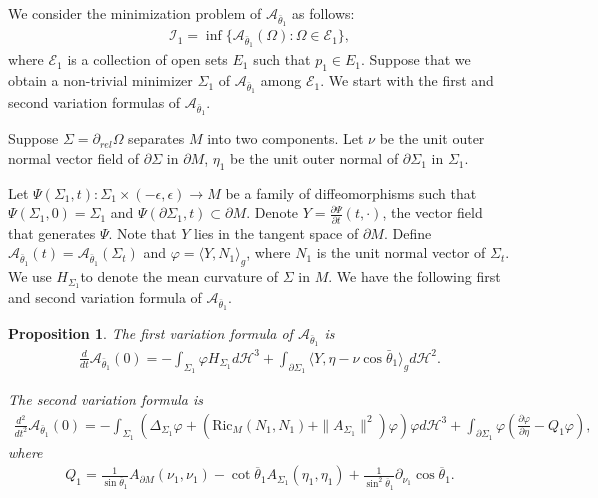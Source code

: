 \documentclass[11pt,letterpaper]{amsart}
\newtheorem{prop}{Proposition}[section]
\begin{document}
We consider the minimization problem of $\mathcal A_{\bar{\theta}_1}$ as follows:
\begin{align}
    \mathcal I_1=\inf\{\mathcal A_{\bar{\theta}_1}(\Omega):\Omega\in\mathcal E_1\},
\end{align}
where $\mathcal E_1$ is a collection of open sets $E_1$ such that $p_1\in E_1$.
Suppose that we obtain a non-trivial minimizer $\Sigma_1$ of $\mathcal A_{\bar{\theta}_1}$ among $\mathcal E_1$. We start with the first and second variation formulas of $\mathcal A_{\bar{\theta}_1}$. 

Suppose $\Sigma=\partial_{rel}\Omega$ separates $M$ into two components. Let $\nu$ be the unit outer normal vector field of $\partial \Sigma$ in $\partial M$, $\eta_1$ be the unit outer normal of $\partial\Sigma_1$ in $\Sigma_1$. 

Let $\Psi(\Sigma_1,t):\Sigma_1\times (-\epsilon,\epsilon)\to M$ be a family of diffeomorphisms such that $\Psi(\Sigma_1,0)=\Sigma_1$ and $\Psi(\partial\Sigma_1,t)\subset \partial M$. Denote $Y=\frac{\partial \Psi}{\partial t}(t,\cdot)$, the vector field that generates $\Psi$. Note that $Y$ lies in the tangent space of $\partial M$. Define $\mathcal A_{\bar{\theta}_1}(t)=\mathcal A_{\bar{\theta}_1}(\Sigma_t)$ and $\varphi=\langle Y,N_1\rangle_g$, where $N_1$ is the unit normal vector of $\Sigma_t$. We use $H_{\Sigma_1}$to denote the mean curvature of $\Sigma$ in $M$. We have the following first and second variation formula of $\mathcal{A}_{\bar{\theta}_1}$.

\begin{prop}\label{prop: first slicing variation}
The first variation formula of $\mathcal A_{\bar{\theta}_1}$ is
\begin{align}
\frac{d}{dt}\mathcal A_{\bar{\theta}_1}(0)=-\int_{\Sigma_1}\varphi H_{\Sigma_1} d\mathcal H^3+\int_{\partial\Sigma_1}\langle Y,\eta-\nu\cos\bar{\theta}_1\rangle_gd \mathcal H^2.
\end{align}

The second variation formula is
\begin{align} \label{secondvariationtheta1}
\frac{d^2}{dt^2}\mathcal A_{\bar{\theta}_1}(0)=-\int_{\Sigma_1}\left(\Delta_{\Sigma_1}\varphi+\left(\text{Ric}_{M}(N_1,N_1)+\|A_{\Sigma_1}\|^2\right)\varphi\right)\varphi d\mathcal H^3+\int_{\partial\Sigma_1}\varphi\left(\frac{\partial \varphi}{\partial\eta}-Q_{1}\varphi\right),
\end{align}
where
\begin{align} \label{q1def}
Q_{1}=\frac{1}{\sin \overline{\theta}_1} A_{\partial M} (\nu_1,\nu_1) - \cot \overline{\theta}_1 A_{\Sigma_1}(\eta_1,\eta_1) + \frac{1}{\sin^{2} \overline{\theta}_1} \partial_{\nu_1} \cos \overline{\theta}_1.
\end{align}
\end{prop}
\end{document}
